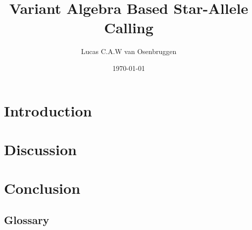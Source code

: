\documentclass[a4paper, 10pt]{article}
\title{Variant Algebra Based Star-Allele Calling\\}
\author[1]{Lucas C.A.W van Osenbruggen}
\affil[1]{Leiden Institute of Advanced Computer Science, Leiden University}
\date{\today}
\begin{document}
%
\maketitle
\thispagestyle{fancy}
\newpage
%
\begin{abstract}
    
\end{abstract}
\newpage
%
\tableofcontents
\newpage
%
\section{Introduction}
\label{section:Introduction}

\newpage
%
%
\section{Discussion}
\label{section:Discussion}

\newpage
%
\section{Conclusion}
\label{section:Conclusion}

\newpage
%
\printbibliography
\newpage
%
\begin{appendix}
    \section{Glossary}
    \label{appendix:Glossary}
    \printglossaries
\end{appendix}
%
\end{document}

